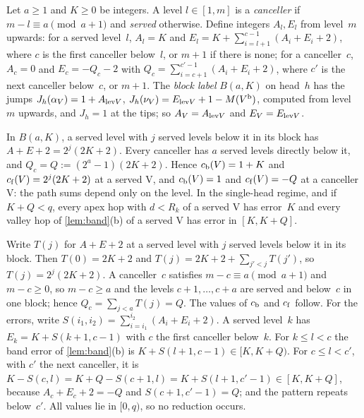 \begin{definition}\label{def:block}
Let $a\ge1$ and $K\ge0$ be integers. A level $l\in[1,m]$ is a \emph{canceller} if $m-l\equiv a\pmod{a+1}$ and
\emph{served} otherwise. Define integers $A_l,E_l$ from level~$m$ upwards: for a served level~$l$, $A_l=K$ and
$E_l=K+\sum_{i=l+1}^{c-1}(A_i+E_i+2)$, where $c$ is the first canceller below~$l$, or $m+1$ if there is none; for a
canceller~$c$, $A_c=0$ and $E_c=-Q_c-2$ with $Q_c=\sum_{i=c+1}^{c'-1}(A_i+E_i+2)$, where $c'$ is the next canceller
below~$c$, or $m+1$. The \emph{block label} $B(a,K)$ on head~$h$ has the jumps $J_h(\alpha_V)=1+A_{\mathrm{lev} V}$,
$J_h(\nu_V)=E_{\mathrm{lev} V}+1-M(V^{\mathrm{b}})$, computed from level~$m$ upwards, and $J_h=1$ at the tips; so $A_V=A_{\mathrm{lev} V}$ and
$E_V=E_{\mathrm{lev} V}$.
\end{definition}

\begin{lemma}\label{lem:block}
\notformalized
In $B(a,K)$, a served level with $j$ served levels below it in its block has $A+E+2=2^j(2K+2)$. Every canceller has $a$
served levels directly below it, and $Q_c=Q:=(2^a-1)(2K+2)$. Hence $c_{\mathrm{b}}(V)=1+K$ and $c_{\mathrm{f}}(V)=2^j(2K+2)$ at a served
V, and $c_{\mathrm{b}}(V)=1$ and $c_{\mathrm{f}}(V)=-Q$ at a canceller V: the path sums depend only on the level. In the single-head
regime, and if $K+Q<q$, every apex hop with $d<R_k$ of a served V has error~$K$ and every valley hop of
\cref{lem:band}(b) of a served V has error in $[K,K+Q]$.
\end{lemma}

\begin{informalproof}
Write $T(j)$ for $A+E+2$ at a served level with $j$ served levels below it in its block. Then $T(0)=2K+2$ and
$T(j)=2K+2+\sum_{j'<j}T(j')$, so $T(j)=2^j(2K+2)$. A canceller~$c$ satisfies $m-c\equiv a\pmod{a+1}$ and $m-c\ge0$, so
$m-c\ge a$ and the levels $c+1,\dots,c+a$ are served and below~$c$ in one block; hence
$Q_c=\sum_{j<a}T(j)=Q$. The values of $c_{\mathrm{b}}$ and $c_{\mathrm{f}}$ follow. For the errors, write
$S(i_1,i_2)=\sum_{i=i_1}^{i_2}(A_i+E_i+2)$. A served level~$k$ has $E_k=K+S(k+1,c-1)$ with $c$ the first canceller below~$k$.
For $k\le l<c$ the band error of \cref{lem:band}(b) is $K+S(l+1,c-1)\in[K,K+Q)$. For $c\le l<c'$, with $c'$ the next
canceller, it is $K-S(c,l)=K+Q-S(c+1,l)=K+S(l+1,c'-1)\in[K,K+Q]$, because $A_c+E_c+2=-Q$ and $S(c+1,c'-1)=Q$; and the
pattern repeats below~$c'$. All values lie in $[0,q)$, so no reduction occurs.
\end{informalproof}

